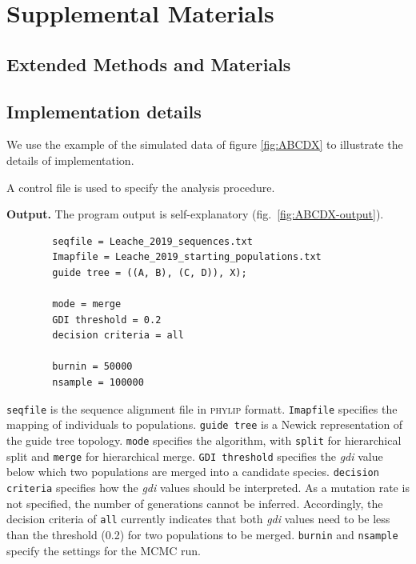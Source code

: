\documentclass[A4]{article1}
\begin{document}

\renewcommand{\bibfont}{\scriptsize}



\newpage
\FloatBarrier %
\setcounter{table}{0} %
\setcounter{figure}{0} %
\renewcommand{\thetable}{S\arabic{table}} %
\renewcommand{\thefigure}{S\arabic{figure}} %

\section{Supplemental Materials}

\subsection{Extended Methods and Materials}

\subsection{Implementation details}

We use the example of the simulated data of figure \ref{fig:ABCDX} to
illustrate the details of implementation.

A control file is used to specify the analysis procedure.

\textbf{Output.}  The program output is self-explanatory (fig.~\ref{fig:ABCDX-output}).

\begin{footnotesize}
    \begin{verbatim}
        seqfile = Leache_2019_sequences.txt
        Imapfile = Leache_2019_starting_populations.txt
        guide tree = ((A, B), (C, D)), X);
        
        mode = merge
        GDI threshold = 0.2
        decision criteria = all
        
        burnin = 50000
        nsample = 100000
    \end{verbatim}
\end{footnotesize}
\texttt{seqfile} is the sequence alignment file in \textsc{phylip} formatt. 
\texttt{Imapfile} specifies the mapping of individuals to populations.  \texttt{guide
    tree} is a Newick representation of the guide tree topology.  \texttt{mode} specifies
the algorithm, with \texttt{split} for hierarchical split and \texttt{merge} for
hierarchical merge. \texttt{GDI threshold} specifies the \textit{gdi} value below which two
populations are merged into a candidate species.  \texttt{decision criteria} specifies
how the \textit{gdi} values should be interpreted.  As a mutation rate is not specified,
the number of generations cannot be inferred.  Accordingly, the decision criteria of
\texttt{all} currently indicates that both \textit{gdi} values need to be less than the
threshold (0.2) for two populations to be merged.  \texttt{burnin} and \texttt{nsample}
specify the settings for the MCMC run.
\end{document}
